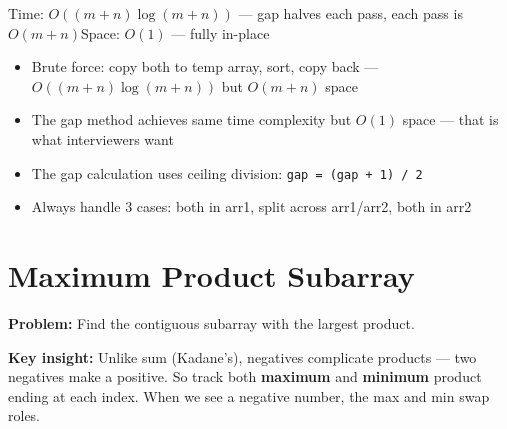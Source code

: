 \documentclass[12pt,a4paper,oneside]{book}
\begin{document}
\begin{complexity}
Time: $O((m+n)\log(m+n))$ --- gap halves each pass, each pass is $O(m+n)$\quad Space: $O(1)$ --- fully in-place
\end{complexity}

\begin{interviewcorner}
\begin{itemize}
  \item Brute force: copy both to temp array, sort, copy back --- $O((m+n)\log(m+n))$ but $O(m+n)$ space
  \item The gap method achieves same time complexity but $O(1)$ space --- that is what interviewers want
  \item The gap calculation uses ceiling division: \texttt{gap = (gap + 1) / 2}
  \item Always handle 3 cases: both in arr1, split across arr1/arr2, both in arr2
\end{itemize}
\end{interviewcorner}

\section{Maximum Product Subarray}

\textbf{Problem:} Find the contiguous subarray with the largest product.

\textbf{Key insight:} Unlike sum (Kadane's), negatives complicate products --- two negatives make a positive. So track both \textbf{maximum} and \textbf{minimum} product ending at each index. When we see a negative number, the max and min swap roles.
\end{document}

